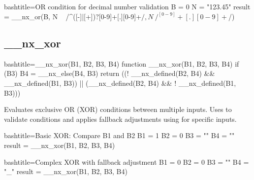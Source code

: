 \begin{NexCodeBox}{bash}{title={OR condition for decimal number validation}}
	B = 0
	N = "123.45"
	result = __nx_or(B, N ~ /^([-]|[+])?[0-9]+[.][0-9]+$/, N ~ /^[0-9]+[.][0-9]+$/)
\end{NexCodeBox}

\newpage
\subsection{__nx_xor}
\label{__nx_xor}
\begin{NexCodeBox}{bash}{title={__nx_xor(B1, B2, B3, B4)}}
function __nx_xor(B1, B2, B3, B4) {
	if (B3)
		B4 = __nx_else(B4, B3)
	return ((! __nx_defined(B2, B4) && __nx_defined(B1, B3)) || (__nx_defined(B2, B4) && ! __nx_defined(B1, B3)))
}
\end{NexCodeBox}

\begin{NexMainBox}
	\begin{NexMainBox}
		Evaluates exclusive OR (XOR) conditions between multiple inputs. Uses  to validate conditions and applies fallback adjustments using  for specific inputs.
	\end{NexMainBox}
	\begin{NexMainBox}
		\begin{NexListDark}
		\end{NexListDark}
	\end{NexMainBox}
\end{NexMainBox}

\begin{NexCodeBox}{bash}{title={Basic XOR: Compare B1 and B2}}
	B1 = 1
	B2 = 0
	B3 = ""
	B4 = ""
	result = __nx_xor(B1, B2, B3, B4)
\end{NexCodeBox}

\begin{NexCodeBox}{bash}{title={Complex XOR with fallback adjustment}}
	B1 = 0
	B2 = 0
	B3 = ""
	B4 = "_"
	result = __nx_xor(B1, B2, B3, B4)
\end{NexCodeBox}

